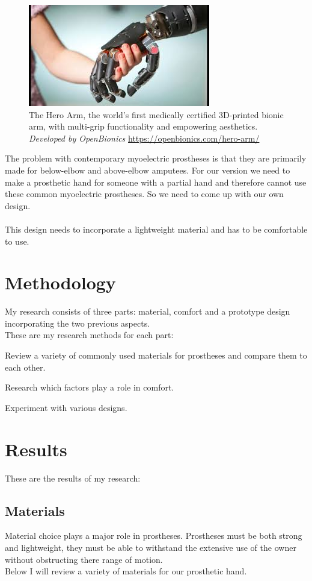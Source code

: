 \documentclass[11pt, a4paper]{article}
\begin{document}
\begin{figure}[h]
    \centering
    \includegraphics[scale=0.7]{HeroArm.jpg}
    \caption{The Hero Arm, the world's first medically certified 3D-printed bionic arm, with multi-grip functionality and empowering aesthetics. \textit{Developed by OpenBionics} \url{https://openbionics.com/hero-arm/}}
    \label{fig:HeroArm}
\end{figure}    

\noindent
The problem with contemporary myoelectric prostheses is that they are primarily made for below-elbow and above-elbow amputees.
For our version we need to make a prosthetic hand for someone with a partial hand and therefore cannot use these common myoelectric prostheses.
So we need to come up with our own design.
\\ \\
This design needs to incorporate a lightweight material and has to be comfortable to use.

\section{Methodology}
My research consists of three parts: material, comfort and a prototype design incorporating the two previous aspects.
\\
These are my research methods for each part:
\begin{description}[align=left]
    \item[Material] Review a variety of commonly used materials for prostheses and compare them to each other.
    \item[Comfort] Research which factors play a role in comfort.
    \item[Prototype design] Experiment with various designs.
\end{description}    

\section{Results}
These are the results of my research:
\subsection{Materials} \label{materials}
Material choice plays a major role in prostheses.
Prostheses must be both strong and lightweight, they must be able to withstand the extensive use of the owner without obstructing there range of motion.
\\
Below I will review a variety of materials for our prosthetic hand.
\end{document}
